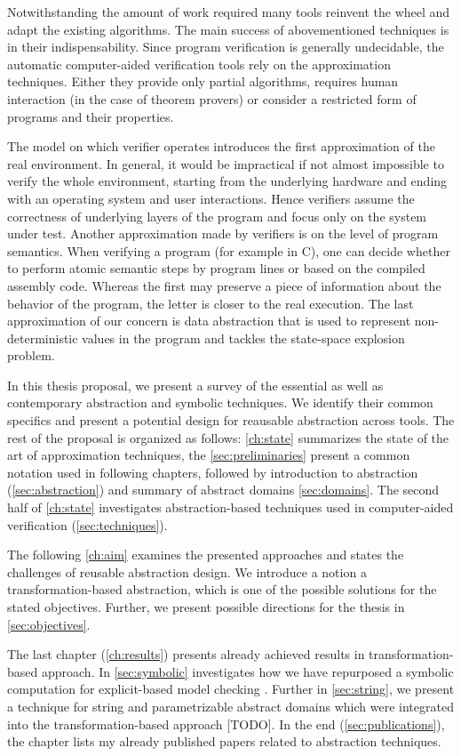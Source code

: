 Notwithstanding the amount of work required many tools reinvent the wheel and adapt the existing algorithms.
The main success of abovementioned techniques is in their indispensability.
Since program verification is generally undecidable, the automatic computer-aided verification tools rely on the approximation techniques.
Either they provide only partial algorithms, requires human interaction (in the case of theorem provers) or consider a restricted form of programs and their properties.

The model on which verifier operates introduces the first approximation of the real environment.
In general, it would be impractical if not almost impossible to verify the whole environment, starting from the underlying hardware and ending with an operating system and user interactions.
Hence verifiers assume the correctness of underlying layers of the program and focus only on the system under test.
Another approximation made by verifiers is on the level of program semantics.  When verifying a program (for example in C), one can decide whether to perform atomic semantic steps by program lines or based on the compiled assembly code. Whereas the first may preserve a piece of information about the behavior of the program, the letter is closer to the real execution.
The last approximation of our concern is data abstraction that is used to represent non-deterministic values in the program and tackles the state-space explosion problem.

In this thesis proposal, we present a survey of the essential as well as contemporary abstraction and symbolic techniques. We identify their common specifics and present a potential design for reausable
abstraction across tools. The rest of the proposal is organized as follows: \autoref{ch:state} summarizes the state of the art of approximation techniques, the \autoref{sec:preliminaries} present a common notation used in following chapters, followed by introduction to abstraction (\autoref{sec:abstraction}) and summary of abstract domains \autoref{sec:domains}. The second half of \autoref{ch:state} investigates abstraction-based techniques used in computer-aided verification (\autoref{sec:techniques}).

The following \autoref{ch:aim} examines the presented approaches and states the
challenges of reusable abstraction design. We introduce a notion a
transformation-based abstraction, which is one of the possible solutions for
the stated objectives. Further, we present possible directions for the thesis
in \autoref{sec:objectives}.

The last chapter (\autoref{ch:results}) presents already achieved results in
transformation-based approach.  In \autoref{sec:symbolic} investigates how we
have repurposed a symbolic computation for explicit-based model checking
\cite{Lauko2019Sym, Lauko2018SymComp}. Further in \autoref{sec:string}, we
present a technique for string and parametrizable abstract domains which were
integrated into the transformation-based approach [TODO].  In the end
(\autoref{sec:publications}), the chapter lists my already published papers
related to abstraction techniques.

